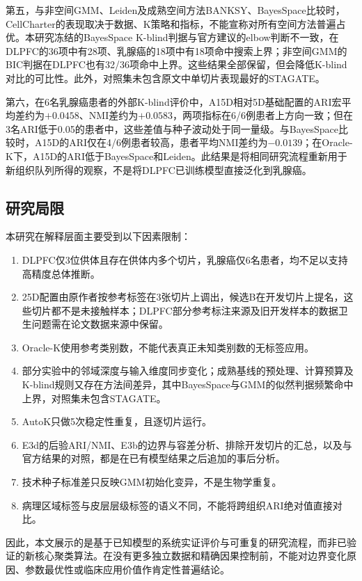 第五，与非空间GMM、Leiden及成熟空间方法BANKSY、BayesSpace比较时，CellCharter的表现取决于数据、K策略和指标，不能宣称对所有空间方法普遍占优。本研究冻结的BayesSpace K-blind判据与官方建议的elbow判断不一致\cite{bayesspacevignette}，在DLPFC的36项中有28项、乳腺癌的18项中有18项命中搜索上界；非空间GMM的BIC判据在DLPFC也有32/36项命中上界。这些结果全部保留，但会降低K-blind对比的可比性。此外，对照集未包含原文中单切片表现最好的STAGATE。

第六，在6名乳腺癌患者的外部K-blind评价中，A15D相对5D基础配置的ARI宏平均差约为$+0.0458$、NMI差约为$+0.0583$，两项指标在6/6例患者上方向一致；但在3名ARI低于0.05的患者中，这些差值与种子波动处于同一量级。与BayesSpace比较时，A15D的ARI仅在4/6例患者较高，患者平均NMI差约为$-0.0139$；在Oracle-K下，A15D的ARI低于BayesSpace和Leiden。此结果是将相同研究流程重新用于新组织队列所得的观察，不是将DLPFC已训练模型直接泛化到乳腺癌。

\subsection{研究局限}
本研究在解释层面主要受到以下因素限制：
\begin{enumerate}
  \item DLPFC仅3位供体且存在供体内多个切片，乳腺癌仅6名患者，均不足以支持高精度总体推断。
  \item 25D配置由原作者按参考标签在3张切片上调出，候选B在开发切片上提名，这些切片都不是未接触样本；DLPFC部分参考标注来源及旧开发样本的数据卫生问题需在论文数据来源中保留。
  \item Oracle-K使用参考类别数，不能代表真正未知类别数的无标签应用。
  \item 部分实验中的邻域深度与输入维度同步变化；成熟基线的预处理、计算预算及K-blind规则又存在方法间差异，其中BayesSpace与GMM的似然判据频繁命中上界，对照集未包含STAGATE。
  \item AutoK只做5次稳定性重复，且逐切片运行。
  \item E3d的后验ARI/NMI、E3b的边界与容差分析、排除开发切片的汇总，以及与官方结果的对照，都是在已有模型结果之后追加的事后分析。
  \item 技术种子标准差只反映GMM初始化变异，不是生物学重复。
  \item 病理区域标签与皮层层级标签的语义不同，不能将跨组织ARI绝对值直接对比。
\end{enumerate}

因此，本文展示的是基于已知模型的系统实证评价与可重复的研究流程，而非已验证的新核心聚类算法。在没有更多独立数据和精确因果控制前，不能对边界变化原因、参数最优性或临床应用价值作肯定性普遍结论。

